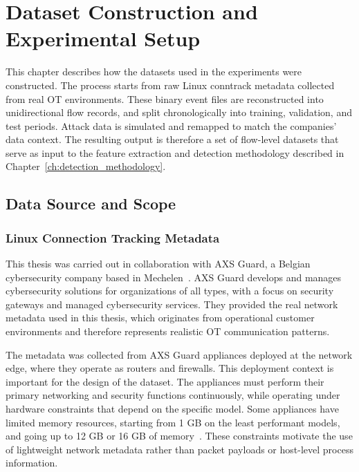 \chapter{Dataset Construction and Experimental Setup}
\label{ch:dataset}
\label{ch:experimental_setup}
This chapter describes how the datasets used in the experiments were constructed. The process starts from raw Linux conntrack metadata collected from real OT environments. These binary event files are reconstructed into unidirectional flow records, and split chronologically into training, validation, and test periods. Attack data is simulated and remapped to match the companies' data context. The resulting output is therefore a set of flow-level datasets that serve as input to the feature extraction and detection methodology described in Chapter~\ref{ch:detection_methodology}.



\section{Data Source and Scope}



\subsection{Linux Connection Tracking Metadata}

This thesis was carried out in collaboration with AXS Guard, a Belgian cybersecurity company based in Mechelen~\cite{axs_guard_meet_nodate}. AXS Guard develops and manages cybersecurity solutions for organizations of all types, with a focus on security gateways and managed cybersecurity services. They provided the real network metadata used in this thesis, which originates from operational customer environments and therefore represents realistic OT communication patterns.

The metadata was collected from AXS Guard appliances deployed at the network edge, where they operate as routers and firewalls. This deployment context is important for the design of the dataset. The appliances must perform their primary networking and security functions continuously, while operating under hardware constraints that depend on the specific model. Some appliances have limited memory resources, starting from 1 GB on the least performant models, and going up to 12 GB or 16 GB of memory~\cite{axs_guard_product_2026}. These constraints motivate the use of lightweight network metadata rather than packet payloads or host-level process information.

